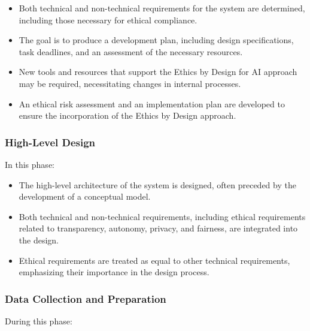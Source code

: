 \documentclass{article}
\begin{document}
\begin{itemize}

    \item Both technical and non-technical requirements for the system are determined, including those necessary for ethical compliance.

    \item The goal is to produce a development plan, including design specifications, task deadlines, and an assessment of the necessary resources.

    \item New tools and resources that support the Ethics by Design for AI approach may be required, necessitating changes in internal processes.

    \item An ethical risk assessment and an implementation plan are developed to ensure the incorporation of the Ethics by Design approach.

\end{itemize}

\subsubsection{High-Level Design}

In this phase:

\begin{itemize}

    \item The high-level architecture of the system is designed, often preceded by the development of a conceptual model.

    \item Both technical and non-technical requirements, including ethical requirements related to transparency, autonomy, privacy, and fairness, are integrated into the design.

    \item Ethical requirements are treated as equal to other technical requirements, emphasizing their importance in the design process.

\end{itemize}

\subsubsection{Data Collection and Preparation}

During this phase:
\end{document}

